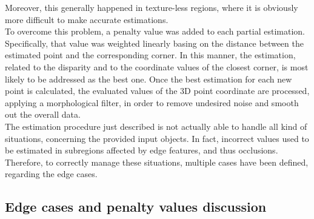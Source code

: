 Moreover, this generally happened in texture-less regions, where it is obviously more difficult to make accurate estimations.\\
To overcome this problem, a penalty value was added to each partial estimation. 
Specifically, that value was weighted linearly basing on the distance between the estimated point and the corresponding corner. 
In this manner, the estimation, related to the disparity and to the coordinate values of the closest corner, is most likely to be addressed as the best one.
Once the best estimation for each new point is calculated, the evaluated values of the 3D point coordinate are processed, applying a morphological filter, in order to remove undesired noise and smooth out the overall data. \\
The estimation procedure just described is not actually able to handle all kind of situations, concerning the provided input objects.
In fact, incorrect values used to be estimated in subregions affected by edge features, and thus occlusions. \\
Therefore, to correctly manage these situations, multiple cases have been defined, regarding the edge cases. 

\subsection{Edge cases and penalty values discussion}
\label{subsection:edge-cases-and-penalties}

